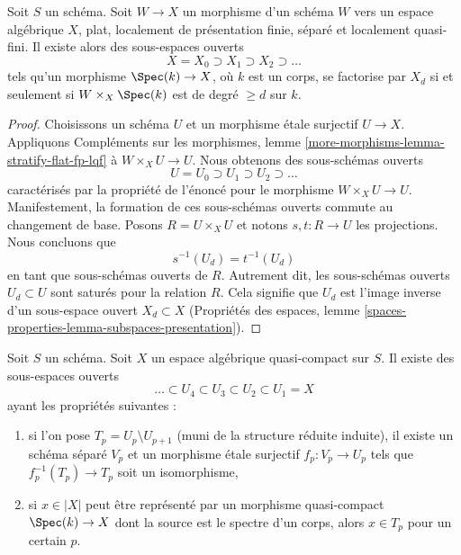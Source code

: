 \begin{lemma}
\label{lemma-stratify-flat-fp-lqf}
Soit $S$ un schéma. Soit $W \to X$ un morphisme d'un schéma $W$
vers un espace algébrique $X$, plat, localement de présentation finie,
séparé et localement quasi-fini. Il existe alors des sous-espaces ouverts
$$
X = X_0 \supset X_1 \supset X_2 \supset \ldots
$$
tels qu'un morphisme $\Spec(k) \to X$, où $k$ est un corps,
se factorise par $X_d$ si et seulement si
$W \times_X \Spec(k)$ est de degré $\geq d$ sur $k$.
\end{lemma}

\begin{proof}
Choisissons un schéma $U$ et un morphisme étale surjectif $U \to X$.
Appliquons Compléments sur les morphismes, lemme
\ref{more-morphisms-lemma-stratify-flat-fp-lqf}
à $W \times_X U \to U$. Nous obtenons des sous-schémas ouverts
$$
U = U_0 \supset U_1 \supset U_2 \supset \ldots
$$
caractérisés par la propriété de l'énoncé pour le morphisme
$W \times_X U \to U$. Manifestement, la formation de ces sous-schémas ouverts
commute au changement de base. Posons $R = U \times_X U$ et notons
$s, t : R \to U$ les projections. Nous concluons que
$$
s^{-1}(U_d) = t^{-1}(U_d)
$$
en tant que sous-schémas ouverts de $R$. Autrement dit, les sous-schémas
ouverts $U_d \subset U$ sont saturés pour la relation $R$. Cela signifie que
$U_d$ est l'image inverse d'un sous-espace ouvert $X_d \subset X$
(Propriétés des espaces, lemme
\ref{spaces-properties-lemma-subspaces-presentation}).
\end{proof}

\begin{lemma}
\label{lemma-filter-quasi-compact}
Soit $S$ un schéma. Soit $X$ un espace algébrique quasi-compact sur $S$.
Il existe des sous-espaces ouverts
$$
\ldots \subset U_4 \subset U_3 \subset U_2 \subset U_1 = X
$$
ayant les propriétés suivantes :
\begin{enumerate}
\item si l'on pose $T_p = U_p \setminus U_{p + 1}$ (muni de la structure
réduite induite), il existe un schéma séparé $V_p$ et un morphisme étale
surjectif $f_p : V_p \to U_p$ tels que $f_p^{-1}(T_p) \to T_p$ soit un
isomorphisme,
\item si $x \in |X|$ peut être représenté par un morphisme quasi-compact
$\Spec(k) \to X$ dont la source est le spectre d'un corps, alors
$x \in T_p$ pour un certain $p$.
\end{enumerate}
\end{lemma}

